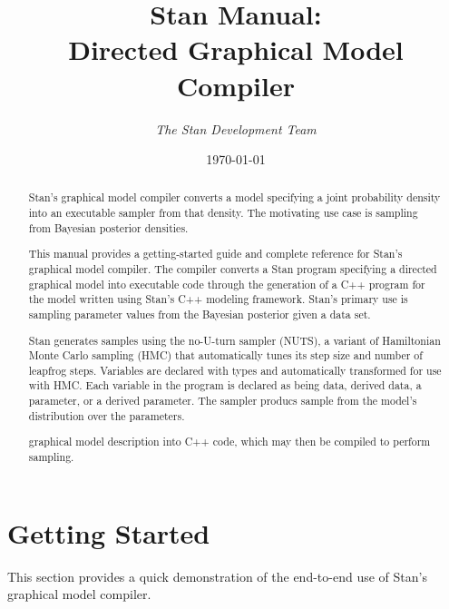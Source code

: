 \documentclass[11pt]{report}
\title{Stan Manual: \\[8pt] {\bf Directed Graphical Model Compiler}}
\author{{\it The Stan Development Team}}
\date{\footnotesize \today}
\begin{document}
\maketitle

\begin{abstract}
  Stan's graphical model compiler converts a model specifying a joint
  probability density into an executable sampler from that density.
  The motivating use case is sampling from Bayesian posterior densities.
  
  This manual provides a getting-started guide and complete reference
  for Stan's graphical model compiler.  The compiler converts a Stan
  program specifying a directed graphical model into executable code
  through the generation of a C++ program for the model written using
  Stan's C++ modeling framework.  Stan's primary use is sampling
  parameter values from the Bayesian posterior given a data set.

  Stan generates samples using the no-U-turn sampler (NUTS), a variant
  of Hamiltonian Monte Carlo sampling (HMC) that automatically tunes
  its step size and number of leapfrog steps.  Variables are declared
  with types and automatically transformed for use with HMC.  Each
  variable in the program is declared as being data, derived data, a
  parameter, or a derived parameter.  The sampler producs sample from
  the model's distribution over the parameters.  

  


  graphical model description into C++ code, which may then be
  compiled to perform sampling.  

\end{abstract}

\chapter{Getting Started}

This section provides a quick demonstration of the end-to-end
use of Stan's graphical model compiler.
\end{document}
